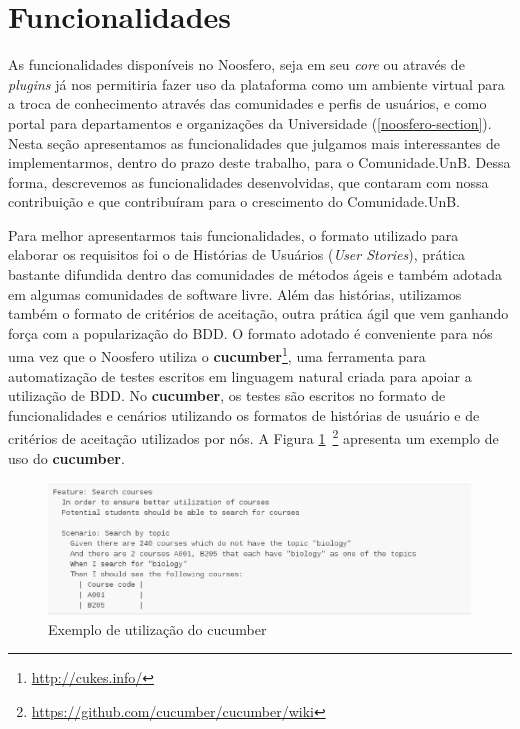 \section{Funcionalidades}
\label{funcionalidades}



As funcionalidades disponíveis no Noosfero, seja em seu \textit{core}
ou através de \textit{plugins} já nos permitiria fazer uso da plataforma como
um ambiente virtual para a troca de conhecimento através das comunidades e
perfis de usuários, e como portal para departamentos e organizações da
Universidade (\ref{noosfero-section}).
%
Nesta seção apresentamos as funcionalidades que julgamos mais interessantes
de implementarmos, dentro do prazo deste trabalho, para o Comunidade.UnB.
%
Dessa forma, descrevemos as funcionalidades desenvolvidas, que contaram com
nossa contribuição e que contribuíram para o crescimento do Comunidade.UnB.


Para melhor apresentarmos tais funcionalidades, o formato utilizado para
elaborar os requisitos foi o de Histórias de Usuários (\textit{User Stories}),
prática bastante difundida dentro das comunidades de métodos ágeis e também
adotada em algumas comunidades de software livre. 
%
Além das histórias, utilizamos também o formato de critérios de aceitação, outra
prática ágil que vem ganhando força com a popularização do BDD.
%
O formato adotado é conveniente para nós uma vez que o Noosfero utiliza o
\textbf{cucumber}\footnote{\url{http://cukes.info/}}, uma ferramenta para
automatização de testes escritos em linguagem natural criada para apoiar a
utilização de BDD. No \textbf{cucumber}, os testes são escritos no formato
de funcionalidades e cenários utilizando os formatos de histórias de
usuário e de critérios de aceitação utilizados por nós. A Figura
\ref{cucumber}~\footnote{\url{https://github.com/cucumber/cucumber/wiki}}
apresenta um exemplo de uso do \textbf{cucumber}.

\begin{figure}[h]
	\centering
	\includegraphics[keepaspectratio=true,scale=0.6]{figuras/cucumber_sample.eps}
	\caption{Exemplo de utilização do cucumber}
	\label{cucumber}
\end{figure}

